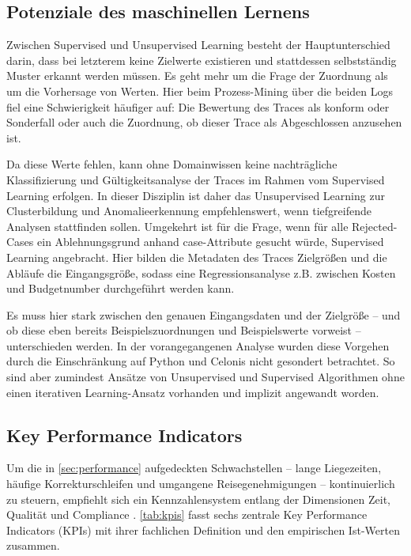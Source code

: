 \subsection{Potenziale des maschinellen Lernens}
\label{sec:ml}
Zwischen Supervised und Unsupervised Learning besteht der Hauptunterschied darin, dass bei letzterem keine Zielwerte existieren und stattdessen selbstständig Muster erkannt werden müssen.
Es geht mehr um die Frage der Zuordnung als um die Vorhersage von Werten.
Hier beim Prozess-Mining über die beiden Logs fiel eine Schwierigkeit häufiger auf: Die Bewertung des Traces als konform oder Sonderfall oder auch die Zuordnung, ob dieser Trace als Abgeschlossen anzusehen ist.\par
Da diese Werte fehlen, kann ohne Domainwissen keine nachträgliche Klassifizierung und Gültigkeitsanalyse der Traces im Rahmen vom Supervised Learning erfolgen.
In dieser Disziplin ist daher das Unsupervised Learning zur Clusterbildung und Anomalieerkennung empfehlenswert, wenn tiefgreifende Analysen stattfinden sollen.
Umgekehrt ist für die Frage, wenn für alle Rejected-Cases ein Ablehnungsgrund anhand case-Attribute gesucht würde, Supervised Learning angebracht.
Hier bilden die Metadaten des Traces Zielgrößen und die Abläufe die Eingangsgröße, sodass eine Regressionsanalyse z.B. zwischen Kosten und Budgetnumber durchgeführt werden kann.\par
Es muss hier stark zwischen den genauen Eingangsdaten und der Zielgröße -- und ob diese eben bereits Beispielszuordnungen und Beispielswerte vorweist -- unterschieden werden.
In der vorangegangenen Analyse wurden diese Vorgehen durch die Einschränkung auf Python und Celonis nicht gesondert betrachtet.
So sind aber zumindest Ansätze von Unsupervised und Supervised Algorithmen ohne einen iterativen Learning-Ansatz vorhanden und implizit angewandt worden.



\subsection{Key Performance Indicators}
\label{sec:kpis}

Um die in \autoref{sec:performance} aufgedeckten Schwachstellen – lange Liegezeiten, häufige Korrekturschleifen und umgangene Reisegenehmigungen – kontinuierlich zu steuern, empfiehlt sich ein Kennzahlensystem entlang der Dimensionen Zeit, Qualität und Compliance \parencite{dumas_fundamentals_2018}. \autoref{tab:kpis} fasst sechs zentrale Key Performance Indicators (KPIs) mit ihrer fachlichen Definition und den empirischen Ist-Werten zusammen.

